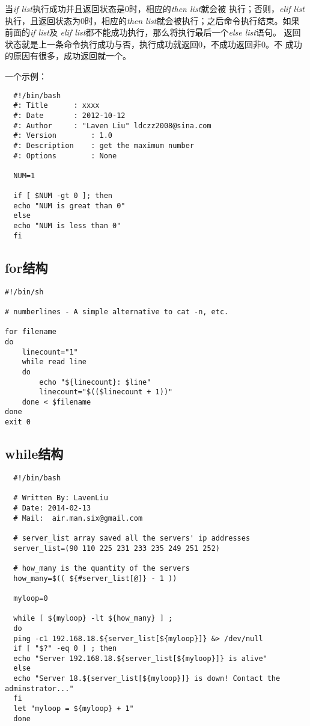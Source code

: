 当\emph{if list}执行成功并且返回状态是0时，相应的\emph{then list}就会被
执行；否则，\emph{elif list}执行，且返回状态为0时，相应的\emph{then
  list}就会被执行；之后命令执行结束。如果前面的\emph{if list}及
\emph{elif list}都不能成功执行，那么将执行最后一个\emph{else list}语句。
返回状态就是上一条命令执行成功与否，执行成功就返回0，不成功返回非0。不
成功的原因有很多，成功返回就一个。

一个示例：

\begin{lstlisting}
  #!/bin/bash
  #: Title		: xxxx
  #: Date		: 2012-10-12
  #: Author		: "Laven Liu" ldczz2008@sina.com
  #: Version		: 1.0
  #: Description	: get the maximum number
  #: Options		: None

  NUM=1

  if [ $NUM -gt 0 ]; then
  echo "NUM is great than 0"
  else
  echo "NUM is less than 0"
  fi
\end{lstlisting}

\subsection{for结构}

\begin{lstlisting}
#!/bin/sh

# numberlines - A simple alternative to cat -n, etc.

for filename
do
    linecount="1"
    while read line
    do
        echo "${linecount}: $line"
        linecount="$(($linecount + 1))"
    done < $filename
done
exit 0
\end{lstlisting}

\subsection{while结构}

\begin{lstlisting}
  #!/bin/bash
  
  # Written By: LavenLiu
  # Date: 2014-02-13
  # Mail:  air.man.six@gmail.com
  
  # server_list array saved all the servers' ip addresses
  server_list=(90 110 225 231 233 235 249 251 252)
  
  # how_many is the quantity of the servers
  how_many=$(( ${#server_list[@]} - 1 ))
  
  myloop=0
  
  while [ ${myloop} -lt ${how_many} ] ;
  do
  ping -c1 192.168.18.${server_list[${myloop}]} &> /dev/null
  if [ "$?" -eq 0 ] ; then
  echo "Server 192.168.18.${server_list[${myloop}]} is alive"
  else
  echo "Server 18.${server_list[${myloop}]} is down! Contact the adminstrator..."
  fi
  let "myloop = ${myloop} + 1"
  done
\end{lstlisting}

